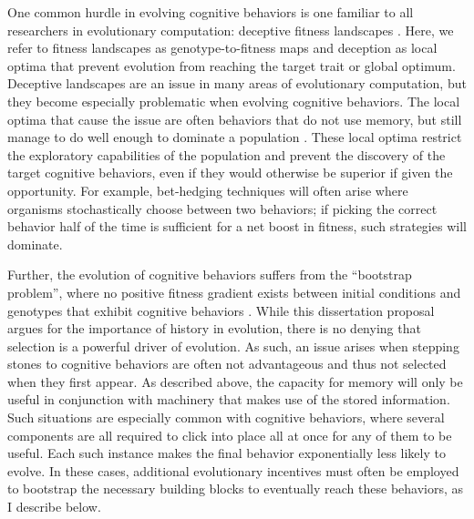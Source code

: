 One common hurdle in evolving cognitive behaviors is one familiar to all researchers in evolutionary computation: deceptive fitness landscapes \citep{lehmanOvercomingDeceptionEvolution2014, whitleyFundamentalPrinciplesDeception1991, silvaOpenIssuesEvolutionary2016}. 
Here, we refer to fitness landscapes as genotype-to-fitness maps %
and deception as local optima that prevent evolution from reaching the target trait or global optimum. 
Deceptive landscapes are an issue in many areas of evolutionary computation, but they become especially problematic when evolving cognitive behaviors. 
The local optima that cause the issue are often behaviors that do not use memory, but still manage to do well enough to dominate a population \citep{risiEvolvingPlasticNeural2010}. %
These local optima restrict the exploratory capabilities of the population and prevent the discovery of the target cognitive behaviors, even if they would otherwise be superior if given the opportunity. %
For example, bet-hedging techniques will often arise where organisms stochastically choose between two behaviors; if picking the correct behavior half of the time is sufficient for a net boost in fitness, such strategies will dominate.

Further, the evolution of cognitive behaviors suffers from the ``bootstrap problem'', where no positive fitness gradient exists between initial conditions and genotypes that exhibit cognitive behaviors \citep{mouretOvercomingBootstrapProblem2009, gomezIncrementalEvolutionComplex1997, silvaOpenIssuesEvolutionary2016}. 
While this dissertation proposal argues for the importance of history in evolution, there is no denying that selection is a powerful driver of evolution. 
As such, an issue arises when stepping stones to cognitive behaviors are often not advantageous and thus not selected when they first appear. 
As described above, the capacity for memory will only be useful in conjunction with machinery that makes use of the stored information.  
Such situations are especially common with cognitive behaviors, where several components are all required to click into place all at once for any of them to be useful.
Each such instance makes the final behavior exponentially less likely to evolve. %
In these cases, additional evolutionary incentives must often be employed to bootstrap the necessary building blocks to eventually reach these behaviors, as I describe below.

